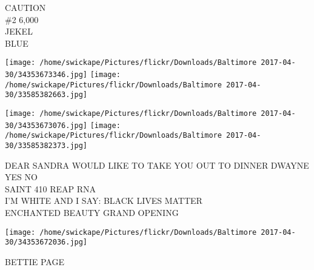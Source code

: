 \documentclass[10pt,letterpaper]{article}
\begin{document}
CAUTION\\
\#2 6,000\\
JEKEL\\
BLUE\\
\pagebreak

\texttt{[image: /home/swickape/Pictures/flickr/Downloads/Baltimore 2017-04-30/34353673346.jpg]}
\texttt{[image: /home/swickape/Pictures/flickr/Downloads/Baltimore 2017-04-30/33585382663.jpg]}

\texttt{[image: /home/swickape/Pictures/flickr/Downloads/Baltimore 2017-04-30/34353673076.jpg]}
\texttt{[image: /home/swickape/Pictures/flickr/Downloads/Baltimore 2017-04-30/33585382373.jpg]}

DEAR SANDRA WOULD LIKE TO TAKE YOU OUT TO DINNER DWAYNE YES NO\\
SAINT 410 REAP RNA\\
I'M WHITE AND I SAY: BLACK LIVES MATTER\\
ENCHANTED BEAUTY GRAND OPENING\\
\pagebreak

\texttt{[image: /home/swickape/Pictures/flickr/Downloads/Baltimore 2017-04-30/34353672036.jpg]}

BETTIE PAGE\\
\pagebreak
\end{document}
